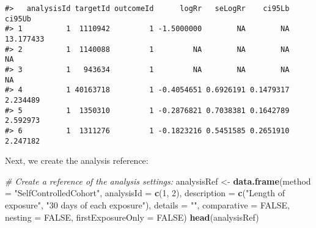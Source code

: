 \documentclass[]{article}
\newenvironment{Shaded}{\begin{snugshade}}{\end{snugshade}}
\newcommand{\CommentTok}[1]{\textcolor[rgb]{0.56,0.35,0.01}{\textit{#1}}}
\newcommand{\DataTypeTok}[1]{\textcolor[rgb]{0.13,0.29,0.53}{#1}}
\newcommand{\DecValTok}[1]{\textcolor[rgb]{0.00,0.00,0.81}{#1}}
\newcommand{\KeywordTok}[1]{\textcolor[rgb]{0.13,0.29,0.53}{\textbf{#1}}}
\newcommand{\NormalTok}[1]{#1}
\newcommand{\OperatorTok}[1]{\textcolor[rgb]{0.81,0.36,0.00}{\textbf{#1}}}
\newcommand{\OtherTok}[1]{\textcolor[rgb]{0.56,0.35,0.01}{#1}}
\newcommand{\StringTok}[1]{\textcolor[rgb]{0.31,0.60,0.02}{#1}}
\begin{document}
\begin{Shaded}
\end{Shaded}

\begin{verbatim}
#>   analysisId targetId outcomeId      logRr   seLogRr    ci95Lb    ci95Ub
#> 1          1  1110942         1 -1.5000000        NA        NA 13.177433
#> 2          1  1140088         1         NA        NA        NA        NA
#> 3          1   943634         1         NA        NA        NA        NA
#> 4          1 40163718         1 -0.4054651 0.6926191 0.1479317  2.234489
#> 5          1  1350310         1 -0.2876821 0.7038381 0.1642789  2.592973
#> 6          1  1311276         1 -0.1823216 0.5451585 0.2651910  2.247182
\end{verbatim}

Next, we create the analysis reference:

\begin{Shaded}
\begin{Highlighting}[]
\CommentTok{# Create a reference of the analysis settings:}
\NormalTok{analysisRef <-}\StringTok{ }\KeywordTok{data.frame}\NormalTok{(}\DataTypeTok{method =} \StringTok{"SelfControlledCohort"}\NormalTok{,}
                          \DataTypeTok{analysisId =} \KeywordTok{c}\NormalTok{(}\DecValTok{1}\NormalTok{, }\DecValTok{2}\NormalTok{),}
                          \DataTypeTok{description =} \KeywordTok{c}\NormalTok{(}\StringTok{"Length of exposure"}\NormalTok{, }
                                          \StringTok{"30 days of each exposure"}\NormalTok{),}
                          \DataTypeTok{details =} \StringTok{""}\NormalTok{,}
                          \DataTypeTok{comparative =} \OtherTok{FALSE}\NormalTok{,}
                          \DataTypeTok{nesting =} \OtherTok{FALSE}\NormalTok{,}
                          \DataTypeTok{firstExposureOnly =} \OtherTok{FALSE}\NormalTok{)}
\KeywordTok{head}\NormalTok{(analysisRef)}
\end{Highlighting}
\end{Shaded}
\end{document}
